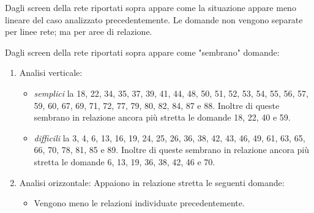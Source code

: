 Dagli screen della rete riportati sopra appare come la situazione appare meno lineare del caso analizzato precedentemente. 
Le domande non vengono separate per linee rete; ma per aree di relazione.


Dagli screen della rete riportati sopra appare come "sembrano" domande:
\begin{enumerate}
\item Analisi verticale:
\begin{itemize}
\item \textit{semplici} la 18, 22, 34, 35, 37, 39, 41, 44, 48, 50, 51, 52, 53, 54, 55, 56, 57, 59, 60, 67, 69,  71, 72, 77, 79, 80, 82, 84, 87 e 88. Inoltre di queste sembrano in relazione ancora pi\`u stretta le domande 18, 22, 40 e 59.
\item \textit{difficili} la 3, 4, 6, 13, 16, 19, 24, 25, 26, 36, 38, 42, 43, 46, 49, 61, 63, 65, 66, 70, 78, 81, 85 e 89. Inoltre di queste sembrano in relazione ancora pi\`u stretta le domande 6, 13, 19, 36, 38, 42, 46 e 70.
\end{itemize}
\item Analisi orizzontale:
Appaiono in relazione stretta le seguenti domande:
\begin{itemize}
\item Vengono meno le relazioni individuate precedentemente.
\end{itemize}
\end{enumerate}
